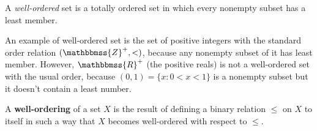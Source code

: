 \documentclass[12pt]{article}
\begin{document}
A \emph{well-ordered} set is a totally ordered set in which every nonempty subset has a least member.

An example of well-ordered set is the set of positive integers with the standard order relation $(\mathbbmss{Z}^+,<)$, because any nonempty subset of it has least member. However,  $\mathbbmss{R}^+$ (the positive reals) is not a well-ordered set with the usual order, because $(0,1)=\{x:0<x<1\}$ is a nonempty subset but it doesn't contain a least number.

A \textbf{well-ordering} of a set $X$ is the result of defining a binary relation $\leq$ on $X$ to itself in such a way that $X$ becomes well-ordered with respect to $\leq$.
\end{document}
